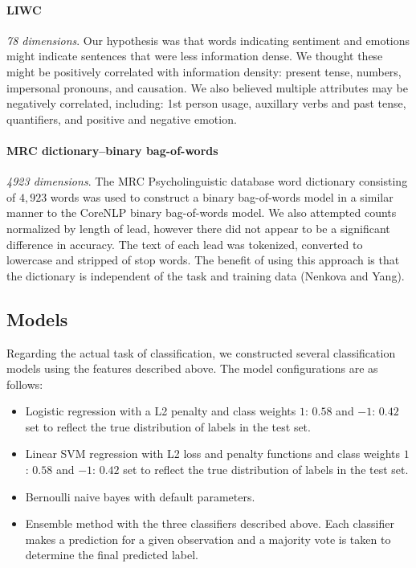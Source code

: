 \documentclass[
10pt, %
a4paper, %
oneside, %
headinclude,footinclude, %
BCOR5mm, %
]{scrartcl}
\begin{document}
\paragraph{\textbf{LIWC}}
\hfill \newline \noindent \textit{78 dimensions}. Our hypothesis was that words
indicating sentiment and emotions might indicate sentences that were less
information dense. We thought these might be positively correlated with
information density: present tense, numbers, impersonal pronouns, and causation.
We also believed multiple attributes may be negatively correlated, including:
1st person usage, auxillary verbs and past tense, quantifiers, and positive and
negative emotion.

\paragraph{\textbf{MRC dictionary--binary bag-of-words}}
\hfill \newline \noindent \textit{4923 dimensions}. 
The MRC Psycholinguistic database word dictionary consisting of $4,923$ words
was used to construct a binary bag-of-words model in a similar manner to the
CoreNLP binary bag-of-words model. We also attempted counts normalized by length
of lead, however there did not appear to be a significant difference in
accuracy. The text of each lead was tokenized, converted to lowercase and
stripped of stop words. The benefit of using this approach is that the
dictionary is independent of the task and training data (Nenkova and Yang).


\subsection{Models}
Regarding the actual task of classification, we constructed several 
classification models using the features described above. The model 
configurations are as follows:

\begin{itemize}
	\item Logistic regression with a L2 penalty and class weights $1$: $0.58$ and
	$-1$: $0.42$ set to reflect the true distribution of labels in the test set.

	\item Linear SVM regression with L2 loss and penalty functions and class 
	weights $1$: $0.58$ and $-1$: $0.42$ set to reflect the true distribution of
	labels in the test set.

	\item Bernoulli naive bayes with default parameters.

	\item Ensemble method with the three classifiers described above. Each 
	classifier makes a prediction for a given observation and a majority vote is
	taken to determine the final predicted label.
\end{itemize}
\end{document}
